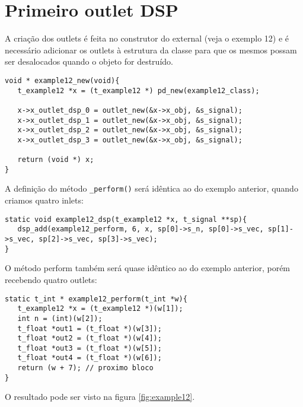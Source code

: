 \section{Primeiro outlet DSP}

A criação dos outlets é feita no construtor do external (veja o exemplo 12) e
é necessário adicionar os outlets à estrutura da classe para que os mesmos
possam ser desalocados quando o objeto for destruído.

\begin{lstlisting}[caption=Criação de outlets DSP]
void * example12_new(void){
   t_example12 *x = (t_example12 *) pd_new(example12_class);

   x->x_outlet_dsp_0 = outlet_new(&x->x_obj, &s_signal);
   x->x_outlet_dsp_1 = outlet_new(&x->x_obj, &s_signal);
   x->x_outlet_dsp_2 = outlet_new(&x->x_obj, &s_signal);
   x->x_outlet_dsp_3 = outlet_new(&x->x_obj, &s_signal);

   return (void *) x;
}
\end{lstlisting}

A definição do método \texttt{\_perform()} será idêntica ao do exemplo
anterior, quando criamos quatro inlets:

\begin{lstlisting}[caption=Método DSP para outlets]
static void example12_dsp(t_example12 *x, t_signal **sp){
   dsp_add(example12_perform, 6, x, sp[0]->s_n, sp[0]->s_vec, sp[1]->s_vec, sp[2]->s_vec, sp[3]->s_vec);
}
\end{lstlisting}

O método perform também será quase idêntico ao do exemplo anterior, porém
recebendo quatro outlets:

\begin{lstlisting}[caption=Método Perform para outlets]
static t_int * example12_perform(t_int *w){
   t_example12 *x = (t_example12 *)(w[1]);
   int n = (int)(w[2]);
   t_float *out1 = (t_float *)(w[3]);
   t_float *out2 = (t_float *)(w[4]);
   t_float *out3 = (t_float *)(w[5]);
   t_float *out4 = (t_float *)(w[6]);
   return (w + 7); // proximo bloco
}
\end{lstlisting}

O resultado pode ser visto na figura \ref{fig:example12}.



